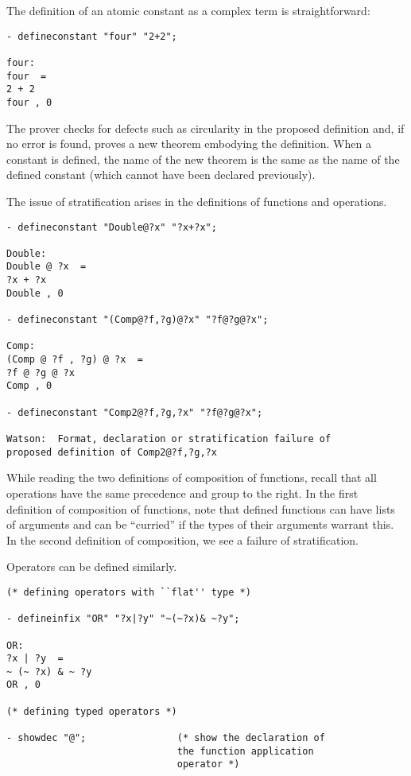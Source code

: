 \documentclass{kluwer}
\begin{document}
\begin{article}
The definition of an atomic constant as a complex term is straightforward:

\begin{verbatim}
- defineconstant "four" "2+2";

four:  
four  =  
2 + 2
four , 0
\end{verbatim}

The prover checks for defects such as circularity in the proposed
definition and, if no error is found, proves a new theorem embodying
the definition.  When a constant is defined, the name of the new
theorem is the same as the name of the defined constant (which cannot
have been declared previously).

The issue of stratification arises in the definitions of functions and
operations.


\begin{verbatim}
- defineconstant "Double@?x" "?x+?x";

Double:  
Double @ ?x  =  
?x + ?x
Double , 0

- defineconstant "(Comp@?f,?g)@?x" "?f@?g@?x";

Comp:  
(Comp @ ?f , ?g) @ ?x  =  
?f @ ?g @ ?x
Comp , 0

- defineconstant "Comp2@?f,?g,?x" "?f@?g@?x";

Watson:  Format, declaration or stratification failure of 
proposed definition of Comp2@?f,?g,?x
\end{verbatim}

While reading the two definitions of composition of functions, recall
that all operations have the same precedence and group to the right.
In the first definition of composition of functions, note that defined
functions can have lists of arguments and can be ``curried'' if the
types of their arguments warrant this.  In the second definition of
composition, we see a failure of stratification.

Operators can be defined similarly.

\begin{verbatim}
(* defining operators with ``flat'' type *)

- defineinfix "OR" "?x|?y" "~(~?x)& ~?y";

OR:  
?x | ?y  =  
~ (~ ?x) & ~ ?y
OR , 0

(* defining typed operators *)

- showdec "@";                (* show the declaration of 
                              the function application 
                              operator *)


\end{verbatim}
\end{article}
\end{document}
